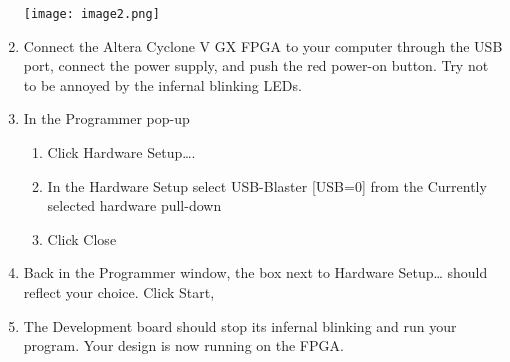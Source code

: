 \begin{enumerate}
        \texttt{[image: image2.png]}

    \item
        Connect the Altera Cyclone V GX FPGA to your computer through the USB
        port, connect the power supply, and push the red power-on button. Try
        not to be annoyed by the infernal blinking LEDs.
    \item
        In the Programmer pop-up

        \begin{enumerate}
                \def\labelenumii{\alph{enumii}.}
            \item
                Click Hardware Setup\ldots.
            \item
                In the Hardware Setup select USB-Blaster {[}USB=0{]} from the
                Currently selected hardware pull-down
            \item
                Click Close
        \end{enumerate}
    \item
        Back in the Programmer window, the box next to Hardware Setup\ldots{}
        should reflect your choice. Click Start,
    \item
        The Development board should stop its infernal blinking and run your
        program. Your design is now running on the FPGA.
\end{enumerate}
